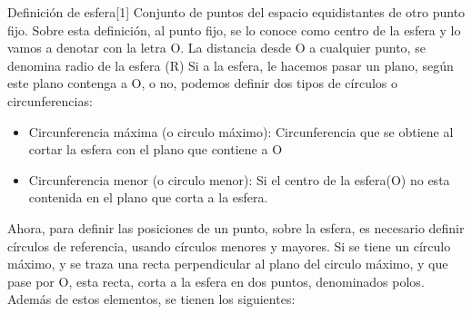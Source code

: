   
Definición de esfera[1] Conjunto de puntos del espacio equidistantes de otro punto fijo. 
Sobre esta definición, al punto fijo, se lo conoce como centro de la esfera y lo vamos a denotar con la letra O. La distancia desde O a cualquier punto, se denomina radio de la esfera (R)  
Si a la esfera, le hacemos pasar un plano, según este plano contenga a O, o no, podemos definir dos tipos de círculos o circunferencias: 
\begin{itemize}
\item Circunferencia máxima (o circulo máximo): Circunferencia que se obtiene al cortar la esfera con el plano que contiene a O 
\item Circunferencia menor (o circulo menor): Si el centro de la esfera(O) no esta contenida en el plano que corta a la esfera. 
\end{itemize}

Ahora, para definir las posiciones de un punto, sobre la esfera, es necesario definir círculos de referencia, usando círculos menores y mayores. Si se tiene un círculo máximo, y se traza una recta perpendicular al plano del circulo máximo, y que pase por O, esta recta, corta a la esfera en dos puntos, denominados polos. Además de estos elementos, se tienen los siguientes: 
